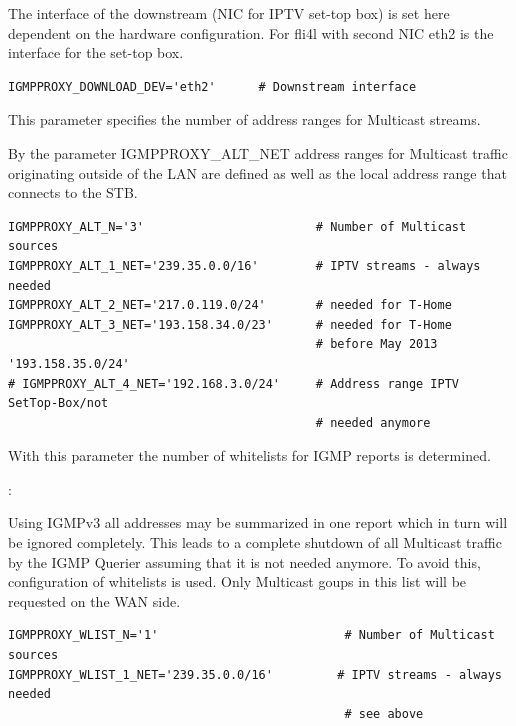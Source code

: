 \begin{description}

The interface of the downstream (NIC for IPTV set-top box) is set here
dependent on the hardware configuration. For fli4l with second NIC eth2
is the interface for the set-top box.

\begin{example}
\begin{verbatim}
IGMPPROXY_DOWNLOAD_DEV='eth2'      # Downstream interface
\end{verbatim}
\end{example}


This parameter specifies the number of address ranges for Multicast streams.


By the parameter IGMPPROXY\_ALT\_NET address ranges for Multicast traffic
originating outside of the LAN are defined as well as the local address range
that connects to the STB.

\begin{example}
\begin{verbatim}
IGMPPROXY_ALT_N='3'                        # Number of Multicast sources
IGMPPROXY_ALT_1_NET='239.35.0.0/16'        # IPTV streams - always needed
IGMPPROXY_ALT_2_NET='217.0.119.0/24'       # needed for T-Home
IGMPPROXY_ALT_3_NET='193.158.34.0/23'      # needed for T-Home
                                           # before May 2013 '193.158.35.0/24'
# IGMPPROXY_ALT_4_NET='192.168.3.0/24'     # Address range IPTV SetTop-Box/not
                                           # needed anymore
\end{verbatim}
\end{example}


With this parameter the number of whitelists for IGMP reports is
determined.

:\newline

Using IGMPv3 all addresses may be summarized in one report which in turn will be
ignored completely. This leads to a complete shutdown of all Multicast traffic by the
IGMP Querier assuming that it is not needed anymore. To avoid this, configuration of
whitelists is used. Only Multicast goups in this list will be requested on the WAN side.

\begin{example}
\begin{verbatim}
IGMPPROXY_WLIST_N='1'                          # Number of Multicast sources
IGMPPROXY_WLIST_1_NET='239.35.0.0/16'         # IPTV streams - always needed
                                               # see above
\end{verbatim}
\end{example}

\end{description}


